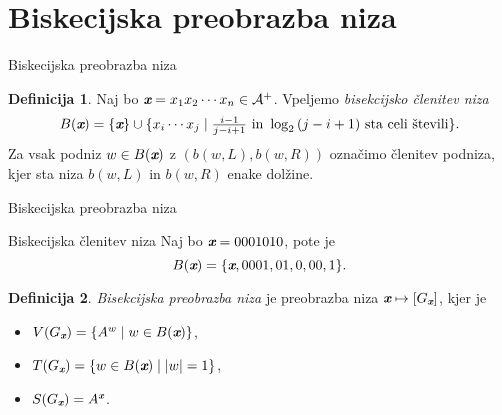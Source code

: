 \documentclass{beamer}
\newcommand{\A}{\mathcal{A}}
\newcommand{\x}{\textit{\textbf{x}}}
\theoremstyle{definition} %
\newtheorem{definicija}{Definicija}[section]
\begin{document}
\section{Biskecijska preobrazba niza}

\begin{frame}{Biskecijska preobrazba niza}
    \begin{definicija}
        Naj bo $ \x = x_1 x_2 \cdots x_n \in \A^+ $.
        Vpeljemo \textit{bisekcijsko členitev niza}
        \[
            B(\x) = \{ \x \} \cup \{ x_i \cdots x_j \mid \tfrac{i-1}{j-i+1} \text{ in } \log_2{(j-i+1)} \text{ sta celi števili}  \}.
        \]
        \pause
        Za vsak podniz $ w \in B(\x) $ z $ ( b(w, L), b(w,R) )$ označimo členitev podniza, kjer sta niza $ b(w, L) $ in $ b(w,R) $ enake dolžine.
    \end{definicija}
\end{frame}

\begin{frame}{Biskecijska preobrazba niza}
    \begin{exampleblock}{Biskecijska členitev niza}
        Naj bo $\x = 0001010 $, pote je
        \[
            B(\x) = \{ \x, 0001, 01, 0, 00, 1 \}.
        \]
    \end{exampleblock}
\end{frame}

\begin{frame}{}
    \begin{definicija}
        \textit{Bisekcijska preobrazba niza} je preobrazba niza $ \x \mapsto [G_{\x}] $, kjer je
        \begin{itemize}
            \item<2-> $ V(G_{\x}) = \{ A^w \mid w \in B(\x) \} $,
            \item<3-> $ T(G_{\x}) = \{ w \in B(\x) \mid |w| = 1 \} $,
            \item<4-> $ S(G_{\x}) = A^{\x} $.
        \end{itemize}
    \end{definicija}
\end{frame}
\end{document}

